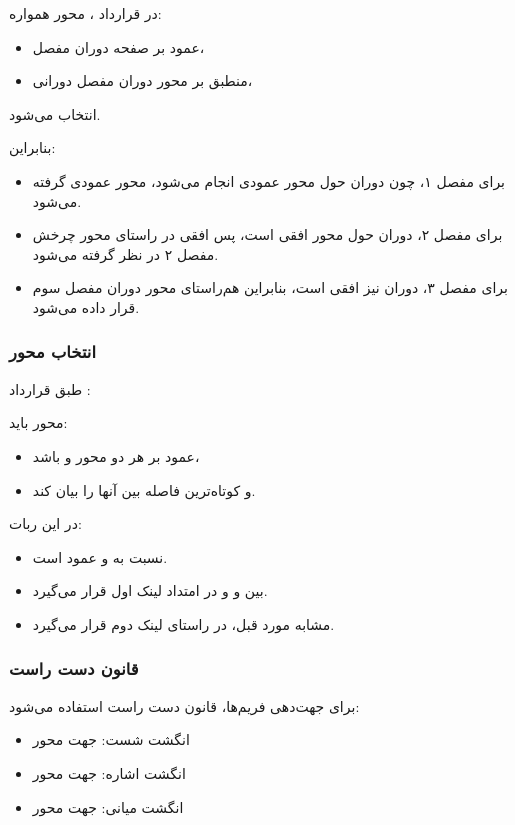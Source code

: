 \documentclass{article}
\begin{document}
در قرارداد ، محور  همواره:
\begin{itemize}
	\item عمود بر صفحه دوران مفصل،
	\item منطبق بر محور دوران مفصل دورانی،
\end{itemize}
انتخاب می‌شود. 

بنابراین:
\begin{itemize}
	\item برای مفصل ۱، چون دوران حول محور عمودی انجام می‌شود، محور  عمودی گرفته می‌شود.
	\item برای مفصل ۲، دوران حول محور افقی است، پس  افقی در راستای محور چرخش مفصل ۲ در نظر گرفته می‌شود.
	\item برای مفصل ۳، دوران نیز افقی است، بنابراین  هم‌راستای محور دوران مفصل سوم قرار داده می‌شود.
\end{itemize}

\subsubsection*{انتخاب محور }

طبق قرارداد :

محور  باید:
\begin{itemize}
	\item عمود بر هر دو محور  و  باشد،
	\item و کوتاه‌ترین فاصله بین آنها را بیان کند.
\end{itemize}

در این ربات:
\begin{itemize}
	\item   {} نسبت به  و  عمود است.
	\item {} بین  و  و در امتداد لینک اول قرار می‌گیرد.
	\item {} مشابه مورد قبل، در راستای لینک دوم قرار می‌گیرد.
\end{itemize}

\subsubsection*{قانون دست راست}

برای جهت‌دهی فریم‌ها، قانون دست راست استفاده می‌شود:
\begin{itemize}
	\item انگشت شست: جهت محور 
	\item انگشت اشاره: جهت محور 
	\item انگشت میانی: جهت محور 
\end{itemize}
\end{document}
